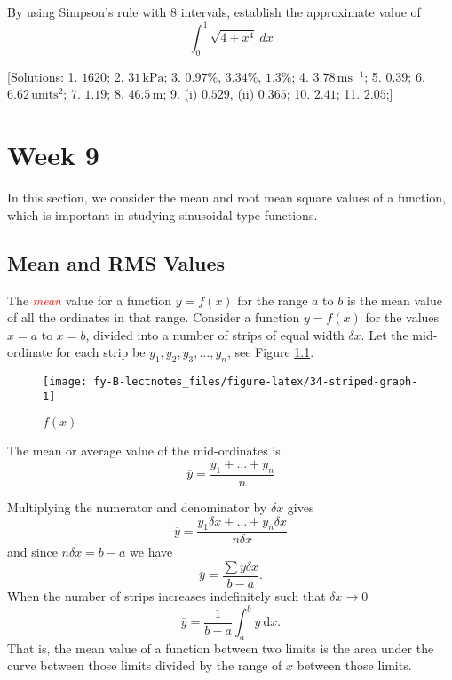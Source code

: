 \documentclass[
  11pt,
  oneside]{book}
\newcommand{\slide}{}
\theoremstyle{definition}
\theoremstyle{definition}
\theoremstyle{definition}
\theoremstyle{definition}
\theoremstyle{remark}
\begin{document}
By using Simpson's rule with 8 intervals, establish the approximate value of
\[
\int_0^1\sqrt{4+x^4}\ dx
\]

{[}Solutions:
1. \(1620\);
2. \(31\,\text{kPa}\);
3. \(0.97\%\), \(3.34\%\), \(1.3\%\);
4. \(3.78\,\text{ms}^{-1}\);
5. \(0.39\);
6. \(6.62\,\text{units}^2\);
7. \(1.19\);
8. \(46.5\,\text{m}\);
9. (i) \(0.529\), (ii) \(0.365\);
10. \(2.41\);
11. \(2.05\);{]}

\chapter{Week 9}\label{week-nine}

In this section, we consider the mean and root mean square values of a function, which is important in studying sinusoidal type functions.

\slide

\section{Mean and RMS Values}\label{mean-and-rms-values}

The \textcolor{red}{\em mean} value for a function \(y = f(x)\) for the range \(a\) to \(b\) is the mean value of all the ordinates in that range. Consider a function \(y = f(x)\) for the values \(x = a\) to \(x = b\), divided into a number of strips of equal width \(\delta x\). Let the mid-ordinate for each strip be \(y_1, y_2, y_3,\ldots,y_n\), see Figure \ref{fig:34-striped-graph}.

\begin{figure}

{\centering \texttt{[image: fy-B-lectnotes\_files/figure-latex/34-striped-graph-1]} 

}

\caption{$f(x)$}\label{fig:34-striped-graph}
\end{figure}

The mean or average value of the mid-ordinates is
\[
\overline y=\frac{y_1+\ldots+y_n}{n}
\]
\slide

Multiplying the numerator and denominator by \(\delta x\) gives
\[
\overline y=\frac{y_1\delta x+\ldots+y_n\delta x}{n\delta x}
\]
and since \(n\delta x = b - a\) we have
\[
\overline y = \frac{\sum y\delta x}{b-a}.
\]
When the number of strips increases indefinitely such that \(\delta x \to 0\)
\[
\overline y = \frac{1}{b-a}\int_a^b y\ \mathrm{d}x.
\]
That is, the mean value of a function between two limits is the area under the curve between those limits divided by the range of \(x\) between those limits.
\end{document}
